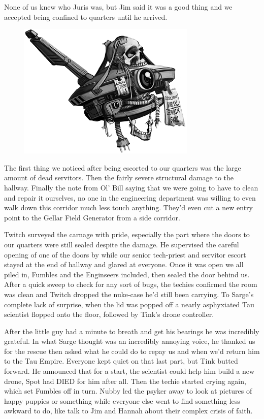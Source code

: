 None of us knew who Juris was, but Jim said it was a good thing and we accepted being confined to quarters until he arrived.

\begin{figure}
	\begin{center}
		\includegraphics[width=\figwidth]{pics/11/93.png}
	\end{center}
\end{figure}
The first thing we noticed after being escorted to our quarters was the large amount of dead servitors. 
Then the fairly severe structural damage to the hallway. 
Finally the note from Ol' Bill saying that we were going to have to clean and repair it ourselves, no one in the engineering department was willing to even walk down this corridor much less touch anything. 
They'd even cut a new entry point to the Gellar Field Generator from a side corridor.

Twitch surveyed the carnage with pride, especially the part where the doors to our quarters were still sealed despite the damage. 
He supervised the careful opening of one of the doors by while our senior tech-priest and servitor escort stayed at the end of hallway and glared at everyone. 
Once it was open we all piled in, Fumbles and the Enginseers included, then sealed the door behind us. 
After a quick sweep to check for any sort of bugs, the techies confirmed the room was clean and Twitch dropped the nuke-case he'd still been carrying. 
To Sarge's complete lack of surprise, when the lid was popped off a nearly asphyxiated Tau scientist flopped onto the floor, followed by Tink's drone controller.

After the little guy had a minute to breath and get his bearings he was incredibly grateful. 
In what Sarge thought was an incredibly annoying voice, he thanked us for the rescue then asked what he could do to repay us and when we'd return him to the Tau Empire. 
Everyone kept quiet on that last part, but Tink butted forward. 
He announced that for a start, the scientist could help him build a new drone, Spot had DIED for him after all. 
Then the techie started crying again, which set Fumbles off in turn. 
Nubby led the psyker away to look at pictures of happy puppies or something while everyone else went to find something less awkward to do, like talk to Jim and Hannah about their complex crisis of faith.

